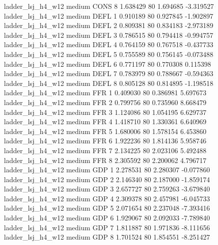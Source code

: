   ladder_lsj_h4_w12     medium     CONS                 8  1.638429 80       1.694685          -3.319527
  ladder_lsj_h4_w12     medium     DEFL                 1  0.910189 80       0.927845          -1.902897
  ladder_lsj_h4_w12     medium     DEFL                 2  0.809381 80       0.834183          -2.973189
  ladder_lsj_h4_w12     medium     DEFL                 3  0.786515 80       0.794418          -0.994757
  ladder_lsj_h4_w12     medium     DEFL                 4  0.764159 80       0.767518          -0.437733
  ladder_lsj_h4_w12     medium     DEFL                 5  0.755589 80       0.756145          -0.073488
  ladder_lsj_h4_w12     medium     DEFL                 6  0.771197 80       0.770308           0.115398
  ladder_lsj_h4_w12     medium     DEFL                 7  0.783979 80       0.788667          -0.594363
  ladder_lsj_h4_w12     medium     DEFL                 8  0.805128 80       0.814895          -1.198518
  ladder_lsj_h4_w12     medium      FFR                 1  0.409030 80       0.386981           5.697673
  ladder_lsj_h4_w12     medium      FFR                 2  0.799756 80       0.735960           8.668479
  ladder_lsj_h4_w12     medium      FFR                 3  1.124086 80       1.054195           6.629737
  ladder_lsj_h4_w12     medium      FFR                 4  1.418710 80       1.330361           6.640969
  ladder_lsj_h4_w12     medium      FFR                 5  1.680006 80       1.578154           6.453860
  ladder_lsj_h4_w12     medium      FFR                 6  1.922236 80       1.814136           5.958746
  ladder_lsj_h4_w12     medium      FFR                 7  2.134225 80       2.023106           5.492488
  ladder_lsj_h4_w12     medium      FFR                 8  2.305592 80       2.200062           4.796717
  ladder_lsj_h4_w12     medium      GDP                 1  2.278531 80       2.280307          -0.077860
  ladder_lsj_h4_w12     medium      GDP                 2  2.146340 80       2.187000          -1.859174
  ladder_lsj_h4_w12     medium      GDP                 3  2.657727 80       2.759263          -3.679840
  ladder_lsj_h4_w12     medium      GDP                 4  2.309378 80       2.457981          -6.045733
  ladder_lsj_h4_w12     medium      GDP                 5  2.071654 80       2.237048          -7.393416
  ladder_lsj_h4_w12     medium      GDP                 6  1.929067 80       2.092033          -7.789840
  ladder_lsj_h4_w12     medium      GDP                 7  1.811887 80       1.971836          -8.111656
  ladder_lsj_h4_w12     medium      GDP                 8  1.701524 80       1.854551          -8.251427
